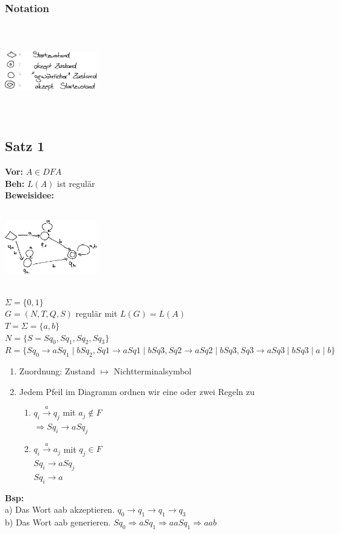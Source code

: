 \documentclass[a4paper,10pt,landscape,twocolumn]{article}
\newcommand{\Bold}[1]{\textbf{#1}} %
\newcommand{\Oben}[2]{\overset{#1}{#2}} %
\begin{document}
\subsubsection{Notation}
\includegraphics[width=0.3\textwidth,height=4cm,keepaspectratio]{Bild2.eps}
\subsection{Satz 1}
\Bold{Vor:} $A\in DFA$\\
\Bold{Beh:} $L(A)$ ist regul\"ar\\
\Bold{Beweisidee:}\\
\includegraphics[width=0.3\textwidth,height=4cm,keepaspectratio]{Bild4.eps}\\
$\Sigma=\{0,1\}$\\
$G=(N,T,Q,S)$ regul\"ar mit $L(G)=L(A)$\\
$T=\Sigma=\{a,b\}$\\
$N=\{S=Sq_0,Sq_1,Sq_2,Sq_3\}$\\
$R=\{Sq_0\to aSq_1\mid bSq_2,Sq1\to aSq1\mid bSq3,Sq2\to aSq2\mid bSq3,Sq3\to aSq3\mid bSq3\mid a\mid b\}$
\begin{enumerate}
 \item Zuordnung: Zustand $\mapsto$ Nichtterminalsymbol
 \item Jedem Pfeil im Diagramm ordnen wir eine oder zwei Regeln zu
 \begin{enumerate}
  \item $q_i\Oben{a}{\to}q_j$ mit $a_j\notin F$\\
  $\Rightarrow Sq_i\to a Sq_j$
  \item $q_i\Oben{a}{\to}a_j$ mit $q_j\in F$\\
  $Sq_i\to a Sq_j$\\
  $Sq_i\to a$
 \end{enumerate}
\end{enumerate}
\Bold{Bsp:}\\ 
a) Das Wort aab akzeptieren. $q_0\to q_1\to q_1\to q_3$\\
b) Das Wort aab generieren. $Sq_0\Rightarrow aSq_1\Rightarrow aaSq_1\Rightarrow aab$
\end{document}
